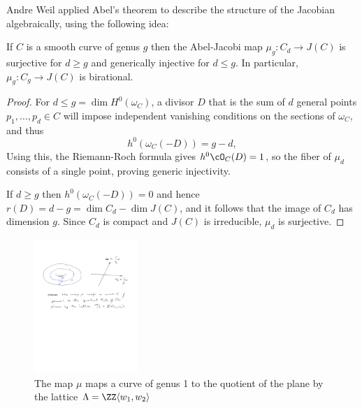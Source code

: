 Andre Weil applied Abel's theorem to describe the structure of the Jacobian algebraically, using the following idea:

\begin{corollary}
If $C$ is a smooth curve of genus $g$ then the Abel-Jacobi map $\mu_g: C_d \to J(C)$ is  surjective for $d\geq g$ and generically injective for $d\leq g$. In particular, $\mu_g:C_g \to J(C)$ is birational. \end{corollary}

\begin{proof}
For $d\leq g = \dim H^{0}(\omega_{C})$,  a divisor $D$ that is the sum of $d$ general points $p_{1}, \dots,  p_{d} \in C$ will impose independent vanishing conditions on the sections of $\omega_{C}$, and thus
$$
h^0(\omega_C(-D)) = g-d,
$$
 Using this, the Riemann-Roch formula gives $h^{0}\cO_{C}(D) = 1$, so the fiber of 
$\mu_{d}$ consists of a single point, proving generic injectivity.

If $d \geq g$ then $h^0(\omega_C(-D)) = 0$ and hence $r(D) = d-g= \dim C_{d} - \dim J(C)$, and it follows that the image of $C_d$ has dimension $g$. Since $C_d$ is compact and $J(C)$ is irreducible, $\mu_{d}$ is surjective.
\end{proof}

%

\begin{figure}
 \caption{The map $\mu$ maps a curve of genus 1 to the quotient of the plane by the lattice $\Lambda = \ZZ\langle w_1,w_2\rangle$}
\centerline {\includegraphics[height=2in]{"Fig4.1.pdf"}}
\end{figure}


